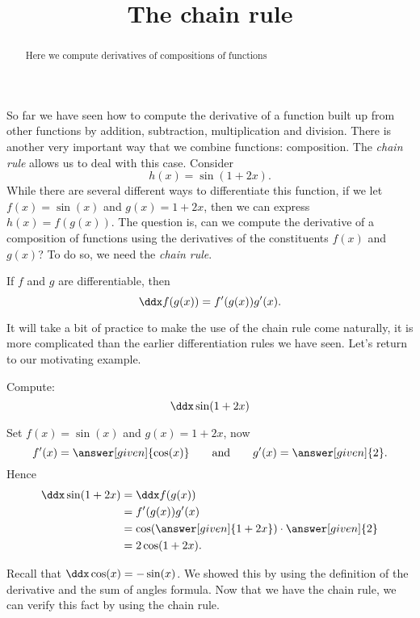 \documentclass{ximera}
\title[Dig-In:]{The chain rule}
\begin{document}
\begin{abstract}
  Here we compute derivatives of compositions of functions
\end{abstract}
\maketitle


So far we have seen how to compute the derivative of a function built
up from other functions by addition, subtraction, multiplication and
division. There is another very important way that we combine
functions: composition. The \textit{chain rule} allows us to deal with
this case. Consider
\[
h(x) = \sin(1+2x).
\] 
While there are several different ways to differentiate this function,
if we let $f(x) = \sin(x)$ and $g(x) = 1+2x$, then we can express
$h(x) = f(g(x))$. The question is, can we compute the derivative of a
composition of functions using the derivatives of the constituents
$f(x)$ and $g(x)$? To do so, we need the \textit{chain rule}.



\begin{theorem}
If $f$ and $g$ are differentiable, then
\[
\ddx f(g(x)) = f'(g(x))g'(x).
\]
\end{theorem}



It will take a bit of practice to make the use of the chain rule come
naturally, it is more complicated than the earlier differentiation
rules we have seen. Let's return to our motivating example.

\begin{example}
Compute:
\[
\ddx \sin(1+2x)
\]

\begin{explanation}
Set $f(x) = \sin(x)$ and $g(x) = 1+2x$, now
\[
f'(x) = \answer[given]{\cos(x)} \qquad\text{and}\qquad g'(x) = \answer[given]{2}.
\]
Hence
\begin{align*}
\ddx \sin(1+2x) &= \ddx f(g(x))\\ 
&=f'(g(x))g'(x) \\
&= \cos(\answer[given]{1+2x})\cdot \answer[given]{2}\\
&= 2\cos(1+2x).
\end{align*}
\end{explanation}
\end{example}

Recall that $\ddx \cos(x) = -\sin(x)$. We showed this by using the definition of the derivative and the sum of angles formula. Now that we have the chain rule, we can verify this fact by using the chain rule.
\end{document}
